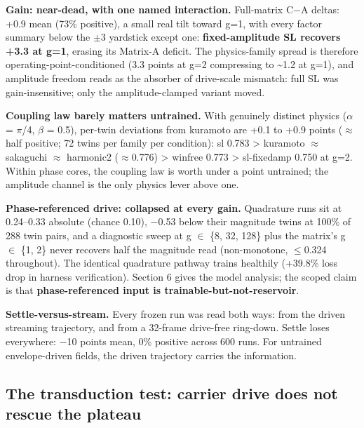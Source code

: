 \documentclass{article}
\begin{document}
\textbf{Gain: near-dead, with one named interaction.} Full-matrix
C\ensuremath{-}A deltas: +0.9 mean (73\% positive), a small real tilt
toward g=1, with every factor summary below the \ensuremath{\pm}3
yardstick except one: \textbf{fixed-amplitude SL recovers +3.3 at g=1},
erasing its Matrix-A deficit. The physics-family spread is therefore
operating-point-conditioned (3.3 points at g=2 compressing to
\textasciitilde1.2 at g=1), and amplitude freedom reads as the absorber
of drive-scale mismatch: full SL was gain-insensitive; only the
amplitude-clamped variant moved.

\textbf{Coupling law barely matters untrained.} With genuinely distinct
physics (\ensuremath{\alpha} = \ensuremath{\pi}/4, \ensuremath{\beta} =
0.5), per-twin deviations from kuramoto are +0.1 to +0.9 points
(\ensuremath{\approx} half positive; 72 twins per family per condition):
sl 0.783 \textgreater{} kuramoto \ensuremath{\approx} sakaguchi
\ensuremath{\approx} harmonic2 (\ensuremath{\approx}0.776)
\textgreater{} winfree 0.773 \textgreater{} sl-fixedamp 0.750 at g=2.
Within phase cores, the coupling law is worth under a point untrained;
the amplitude channel is the only physics lever above one.

\textbf{Phase-referenced drive: collapsed at every gain.} Quadrature
runs sit at 0.24--0.33 absolute (chance 0.10), \ensuremath{-}0.53 below
their magnitude twins at 100\% of 288 twin pairs, and a diagnostic sweep
at g \ensuremath{\in} \{8, 32, 128\} plus the matrix's g
\ensuremath{\in} \{1, 2\} never recovers half the magnitude read
(non-monotone, \ensuremath{\leq}0.324 throughout). The identical
quadrature pathway trains healthily (+39.8\% loss drop in harness
verification). Section 6 gives the model analysis; the scoped claim is
that \textbf{phase-referenced input is trainable-but-not-reservoir}.

\textbf{Settle-versus-stream.} Every frozen run was read both ways: from
the driven streaming trajectory, and from a 32-frame drive-free
ring-down. Settle loses everywhere: \ensuremath{-}10 points mean, 0\%
positive across 600 runs. For untrained envelope-driven fields, the
driven trajectory carries the information.

\subsection{The transduction test: carrier drive does not rescue the
plateau}\label{the-transduction-test-carrier-drive-does-not-rescue-the-plateau}
\end{document}
